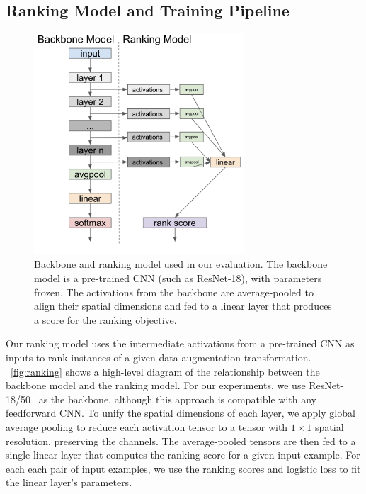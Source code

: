 \subsection{Ranking Model and Training Pipeline}
\begin{figure}[tb]
\includegraphics[width=0.7\textwidth]{diagrams/ranking.png}
\caption{Backbone and ranking model used in our evaluation. The backbone model is a pre-trained CNN (such as ResNet-18), with parameters frozen. The activations from the backbone are average-pooled to align their spatial dimensions and fed to a linear layer that produces a score for the ranking objective.}
\label{fig:ranking}
\end{figure}

Our ranking model uses the intermediate activations from a pre-trained CNN as inputs to rank instances of a given data augmentation transformation.
~\autoref{fig:ranking} shows a high-level diagram of the relationship between the backbone model and the ranking model.
For our experiments, we use ResNet-18/50~\cite{he2016deep} as the backbone, although this approach is compatible with any feedforward CNN.
To unify the spatial dimensions of each layer, we apply global average pooling to reduce each activation tensor to a tensor with $1\times 1$ spatial resolution, preserving the channels.
The average-pooled tensors are then fed to a single linear layer that computes the ranking score for a given input example.
For each each pair of input examples, we use the ranking scores and logistic loss to fit the linear layer's parameters.



